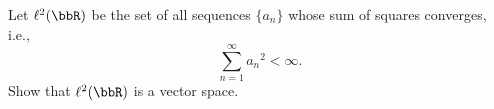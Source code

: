 \begin{questions}
  \question Let $\ell^2(\bbR)$ be the set of all sequences $\{a_n\}$ whose
  sum of squares converges, i.e.,
  \[
    \sum_{n=1}^\infty {a_n}^2<\infty.
  \]
  Show that $\ell^2(\bbR)$ is a vector space.
  \bigskip\bigskip\bigskip
  \bigskip\bigskip\bigskip
  \bigskip\bigskip\bigskip
  \bigskip\bigskip\bigskip
  \question
\end{questions}

